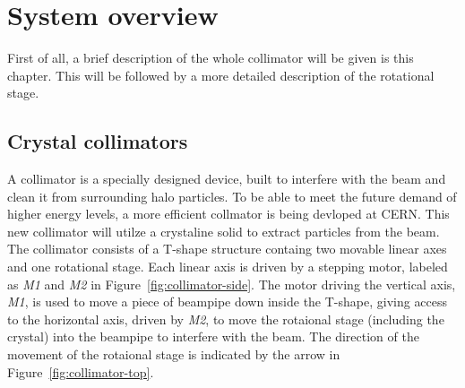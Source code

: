 \chapter{System overview}\label{cha:systemOverview}

 First of all, a brief description of the whole collimator will be given is this chapter. This will be followed by a more detailed description of the rotational stage.

\section{Crystal collimators}
A collimator is a specially designed device, built to interfere with the beam and clean it from surrounding halo particles. To be able to meet the future demand of higher energy levels, a more efficient collmator is being devloped at CERN. This new collimator will utilze a crystaline solid to extract particles from the beam. The collimator consists of a T-shape structure containg two movable linear axes and one rotational stage. Each linear axis is driven by a stepping motor, labeled as \emph{M1} and \emph{M2} in Figure~\ref{fig:collimator-side}. The motor driving the vertical axis, \emph{M1}, is used to move a piece of beampipe down inside the T-shape, giving access to the horizontal axis, driven by \emph{M2}, to move the rotaional stage (including the crystal) into the beampipe to interfere with the beam. The direction of the movement of the rotaional stage is indicated by the arrow in Figure~\ref{fig:collimator-top}.

